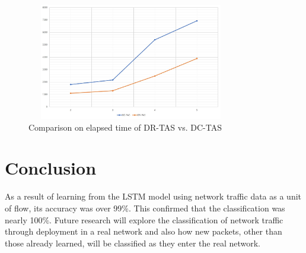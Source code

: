 \documentclass[10pt, twoside, jounal]{IEEEtran}
\begin{document}
\begin{figure}[!t]
\centering
\setlength{\abovecaptionskip}{0pt}
\setlength{\belowcaptionskip}{0pt}
{
\includegraphics[width=3.6in, height=2.0in]{fig7.jpg}
\caption{Comparison on elapsed time of DR-TAS vs. DC-TAS}
\label{fig6}
}
\end{figure}


\section{Conclusion}
As a result of learning from the LSTM model using network traffic data as a unit of flow, its accuracy was over 99$\%$. This confirmed that the classification was nearly 100$\%$.
Future research will explore the classification of network traffic through deployment in a real network and also how new packets, other than those already learned, will be classified as they enter the real network.

\ifCLASSOPTIONcaptionsoff
  \newpage
\fi


\end{document}
